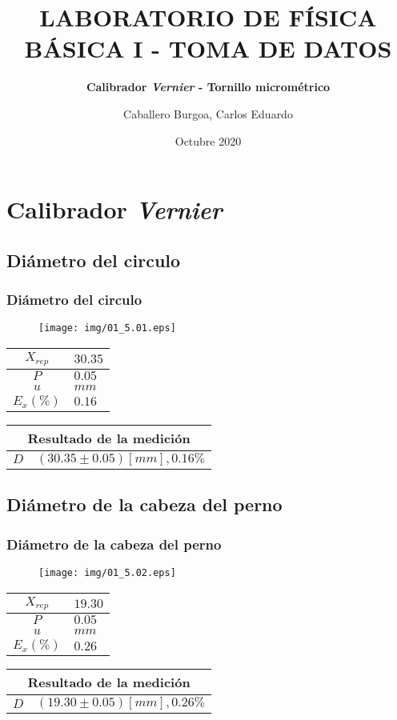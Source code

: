 \documentclass[letter,11pt]{beamer}
\title{\textbf{LABORATORIO DE FÍSICA BÁSICA I - TOMA DE DATOS}}
\subtitle{\textbf{Calibrador \emph{Vernier} - Tornillo micrométrico}}
\author{\small{Caballero Burgoa, Carlos Eduardo}}
\date{\tiny{Octubre 2020}}
\begin{document}
\begin{frame}
\titlepage
\end{frame}

\section{Calibrador \emph{Vernier}}

\subsection{Diámetro del circulo}
\begin{frame}
\frametitle{Diámetro del circulo}
\vspace*{0.8cm}
\begin{figure}
\centering
\texttt{[image: img/01\_5.01.eps]}
\end{figure}
\vspace*{0.4cm}
\scriptsize
\begin{tabular}{|c|>{\centering}m{1.8cm}<{\centering}|}
\hline
$X_{rep}$ &  $30.35$ \tabularnewline \hline
      $P$ &   $0.05$ \tabularnewline \hline
      $u$ &     $mm$ \tabularnewline \hline
$E_x(\%)$ &   $0.16$ \tabularnewline \hline
\end{tabular}
\quad
\begin{tabular}{|c|>{\centering}m{5.7cm}<{\centering}|}
\hline
\multicolumn{2}{|c|}{\textbf{Resultado de la medición}} \\ \hline
$D$ & $( 30.35\pm0.05)[mm], 0.16\%$ \tabularnewline \hline
\end{tabular}
\end{frame}

\subsection{Diámetro de la cabeza del perno}
\begin{frame}
\frametitle{Diámetro de la cabeza del perno}
\vspace*{0.8cm}
\begin{figure}
\centering
\texttt{[image: img/01\_5.02.eps]}
\end{figure}
\vspace*{0.4cm}
\scriptsize
\begin{tabular}{|c|>{\centering}m{1.8cm}<{\centering}|}
\hline
$X_{rep}$ &  $19.30$ \tabularnewline \hline
      $P$ &   $0.05$ \tabularnewline \hline
      $u$ &     $mm$ \tabularnewline \hline
$E_x(\%)$ &   $0.26$ \tabularnewline \hline
\end{tabular}
\quad
\begin{tabular}{|c|>{\centering}m{5.7cm}<{\centering}|}
\hline
\multicolumn{2}{|c|}{\textbf{Resultado de la medición}} \\ \hline
$D$ & $( 19.30\pm0.05)[mm], 0.26\%$ \tabularnewline \hline
\end{tabular}
\end{frame}
\end{document}

